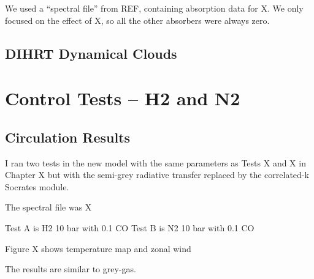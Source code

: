 We used a ``spectral file'' from REF, containing absorption data for X. We only focused on the effect of X, so all the other absorbers were always zero.

\subsection{DIHRT Dynamical Clouds}


\section{Control Tests -- H2 and N2}


\subsection{Circulation Results}

I ran two tests in the new model with the same parameters as Tests X and X in Chapter X but with the semi-grey radiative transfer replaced by the correlated-k Socrates module.

The spectral file was X

Test A is H2 10 bar with 0.1 CO
Test B is N2 10 bar with 0.1 CO



Figure X shows temperature map and zonal wind

The results are similar to grey-gas.

